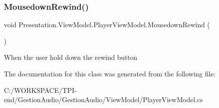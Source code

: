 \mbox{\label{class_presentation_1_1_view_model_1_1_player_view_model_a9239c10b2baf32dbec43fb6a15e902a8}} 
\subsubsection{\texorpdfstring{Mousedown\+Rewind()}{MousedownRewind()}}
{\footnotesize\ttfamily void Presentation.\+View\+Model.\+Player\+View\+Model.\+Mousedown\+Rewind (\begin{DoxyParamCaption}{ }\end{DoxyParamCaption})}



When the user hold down the rewind button 



The documentation for this class was generated from the following file\+:\begin{DoxyCompactItemize}
\item 
C\+:/\+W\+O\+R\+K\+S\+P\+A\+C\+E/\+T\+P\+I-\/end/\+Gestion\+Audio/\+Gestion\+Audio/\+View\+Model/Player\+View\+Model.\+cs\end{DoxyCompactItemize}
